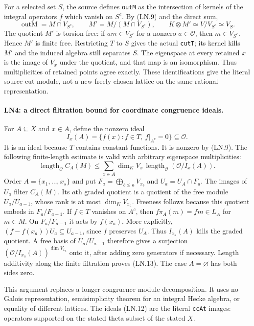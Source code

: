 For a selected set $S$, the source defines \texttt{outM} as the
intersection of kernels of the integral operators $f$ which vanish
on $S^c$.  By (LN.9) and the direct sum,
\[
 \operatorname{outM}=M\cap V_{S^c},\qquad
 M'=M/(M\cap V_{S^c}),\qquad
 K\otimes M'\simeq V/V_{S^c}\simeq V_S.              \tag{LN.11}
\]
The quotient $M'$ is torsion-free: if $am\in V_{S^c}$ for a
nonzero $a\in\mathcal O$, then $m\in V_{S^c}$.  Hence $M'$ is
finite free.  Restricting $T$ to $S$ gives the actual \texttt{cutT};
its kernel kills $M'$ and the induced algebra still separates $S$.
The eigenspace at every retained $x$ is the image of $V_x$ under the
quotient, and that map is an isomorphism.  Thus multiplicities of
retained points agree exactly.  These identifications give the
literal source cut module, not a new freely chosen lattice on the
same rational representation.

\paragraph{LN4: a direct filtration bound for coordinate congruence ideals.}
\label{claim:LN4}
For $A\subseteq X$ and $x\in A$, define the nonzero ideal
\[
 I_x(A)=\{f(x):f\in T,\ f|_{A^c}=0\}\subseteq\mathcal O.
 \tag{LN.12}
\]
It is an ideal because $T$ contains constant functions.  It is
nonzero by (LN.9).  The following finite-length estimate is valid
with arbitrary eigenspace multiplicities:
\[
 \operatorname{length}_{\mathcal O} C_A(M)
 \le\sum_{x\in A}\dim_KV_x\,
             \operatorname{length}_{\mathcal O}(\mathcal O/I_x(A)).
 \tag{LN.13}
\]
Order $A=\{x_1,\ldots,x_s\}$ and put
$F_a=\bigoplus_{b\le a}V_{x_b}$ and $U_a=U_A\cap F_a$.
The images of $U_a$ filter $C_A(M)$.  Its $a$th graded quotient is
a quotient of the free module $U_a/U_{a-1}$, whose rank is at most
$\dim_KV_{x_a}$.  Freeness follows because this quotient embeds in
$F_a/F_{a-1}$.  If $f\in T$ vanishes on $A^c$, then
$f\pi_A(m)=fm\in L_A$ for $m\in M$.  On $F_a/F_{a-1}$ it acts by
$f(x_a)$.  More explicitly,
$(f-f(x_a))U_a\subseteq U_{a-1}$, since $f$ preserves $U_A$.
Thus $I_{x_a}(A)$ kills the graded quotient.  A free basis of
$U_a/U_{a-1}$ therefore gives a surjection
$(\mathcal O/I_{x_a}(A))^{\dim V_{x_a}}$ onto it, after adding
zero generators if necessary.  Length additivity along the finite
filtration proves (LN.13).  The case $A=\varnothing$ has both sides
zero.

This argument replaces a longer congruence-module decomposition.
It uses no Galois representation, semisimplicity theorem for an
integral Hecke algebra, or equality of different lattices.  The
ideals (LN.12) are the literal \texttt{ccAt} images: operators
supported on the stated theta subset of the stated $X$.

